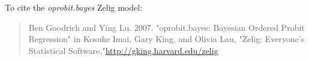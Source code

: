 To cite the \emph{ oprobit.bayes } Zelig model:
 \begin{verse}
 Ben Goodrich and Ying Lu. 2007. "oprobit.bayes: Bayesian Ordered Probit Regression" in Kosuke Imai, Gary King, and Olivia Lau, "Zelig: Everyone's Statistical Software,"\url{http://gking.harvard.edu/zelig} 
\end{verse}